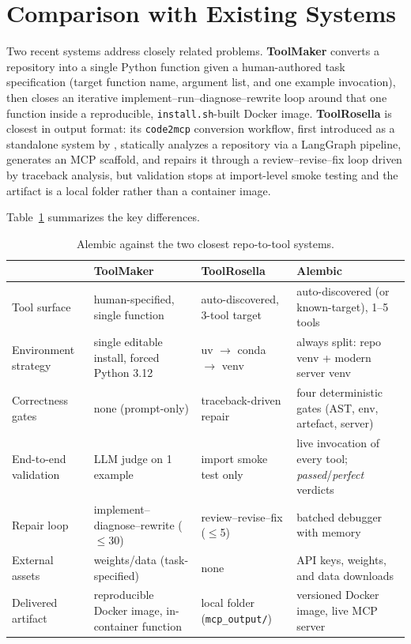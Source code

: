 \section{Comparison with Existing Systems}
\label{sec:related}

Two recent systems address closely related problems. \textbf{ToolMaker} \citep{toolmaker2025} converts a repository into a single Python function given a human-authored task specification (target function name, argument list, and one example invocation), then closes an iterative implement–run–diagnose–rewrite loop around that one function inside a reproducible, \texttt{install.sh}-built Docker image. \textbf{ToolRosella} \citep{toolrosella2026} is closest in output format: its \texttt{code2mcp} conversion workflow, first introduced as a standalone system by \citet{code2mcp2025}, statically analyzes a repository via a LangGraph pipeline, generates an MCP scaffold, and repairs it through a review–revise–fix loop driven by traceback analysis, but validation stops at import-level smoke testing and the artifact is a local folder rather than a container image.

Table~\ref{tab:comparison} summarizes the key differences.

\begin{table}[t]
  \centering
  \small
  \begin{tabular}{@{}p{2.3cm}p{3.8cm}p{3.8cm}p{4.1cm}@{}}
    \toprule
    & \textbf{ToolMaker} & \textbf{ToolRosella} & \textbf{Alembic} \\
    \midrule
    Tool surface & human-specified, single function & auto-discovered, 3-tool target & auto-discovered (or known-target), 1--5 tools \\
    Environment strategy & single editable install, forced Python 3.12 & uv $\to$ conda $\to$ venv & always split: repo venv + modern server venv \\
    Correctness gates & none (prompt-only) & traceback-driven repair & four deterministic gates (AST, env, artefact, server) \\
    End-to-end validation & LLM judge on 1 example & import smoke test only & live invocation of every tool; \emph{passed}/\emph{perfect} verdicts \\
    Repair loop & implement--diagnose--rewrite ($\le$30) & review--revise--fix ($\le$5) & batched debugger with memory \\
    External assets & weights/data (task-specified) & none & API keys, weights, and data downloads \\
    Delivered artifact & reproducible Docker image, in-container function & local folder (\texttt{mcp\_output/}) & versioned Docker image, live MCP server \\
    \bottomrule
  \end{tabular}
  \caption{Alembic against the two closest repo-to-tool systems.}
  \label{tab:comparison}
\end{table}

